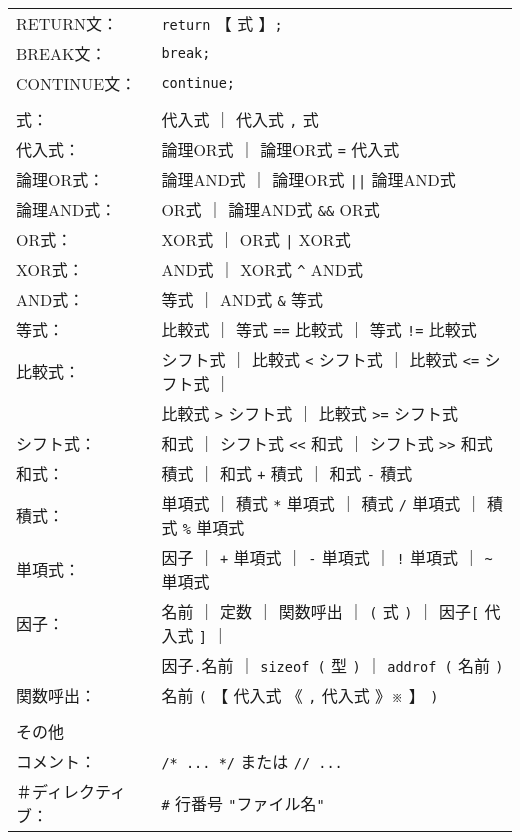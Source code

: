 \begin{mylist}
{{\begin{tabular}{l l}
RETURN文：    & \verb+return+ 【 式 】\verb+;+ \\
BREAK文：     & \verb+break;+ \\
CONTINUE文：  & \verb+continue;+ \\
\\
式：          & 代入式 ｜ 代入式 \verb+,+ 式 \\
代入式：      & 論理OR式 ｜ 論理OR式 \verb+=+ 代入式 \\
論理OR式：    & 論理AND式 ｜ 論理OR式  \verb+||+ 論理AND式 \\
論理AND式：   & OR式 ｜ 論理AND式 \verb+&&+ OR式 \\
OR式：        & XOR式 ｜ OR式 \verb+|+ XOR式 \\
XOR式：       & AND式 ｜ XOR式 \verb+^+ AND式 \\
AND式：       & 等式 ｜ AND式 \verb+&+ 等式 \\
等式：        & 比較式 ｜ 等式 \verb+==+ 比較式 ｜ 等式 \verb+!=+ 比較式 \\
比較式：      & シフト式 ｜ 比較式 \verb+<+ シフト式  ｜
                比較式 \verb+<=+ シフト式 ｜ \\
              & 比較式 \verb+>+ シフト式 ｜ 比較式 \verb+>=+ シフト式 \\
シフト式：    & 和式 ｜ シフト式 \verb+<<+ 和式 ｜ シフト式 \verb+>>+ 和式 \\
和式：        & 積式 ｜ 和式 \verb/+/ 積式 ｜ 和式 \verb+-+ 積式 \\
積式：        & 単項式 ｜ 積式 \verb+*+ 単項式 ｜
                積式 \verb+/+ 単項式 ｜ 積式 \verb+%+ 単項式 \\
単項式：      & 因子 ｜ \verb/+/ 単項式 ｜ \verb+-+ 単項式 ｜
                \verb+!+ 単項式 ｜ \verb+~+ 単項式 \\
因子：        & 名前 ｜ 定数 ｜ 関数呼出 ｜ \verb+(+ 式 \verb+)+ ｜
                因子\verb+[+ 代入式 \verb+]+ ｜ \\
              & 因子\verb+.+名前 ｜ \verb+sizeof (+ 型 \verb+)+ ｜
                \verb+addrof (+ 名前 \verb+)+ \\
関数呼出：    & 名前 \verb+(+ 【 代入式 《 \verb+,+ 代入式 》※ 】 \verb+)+\\
\\
その他 & \\
コメント：    & \verb+/* ... */+ または \verb+// ...+ \\
＃ディレクティブ： & \verb+#+ 行番号 \verb+"+ファイル名\verb+"+\\
\end{tabular}
}}
\end{mylist}

